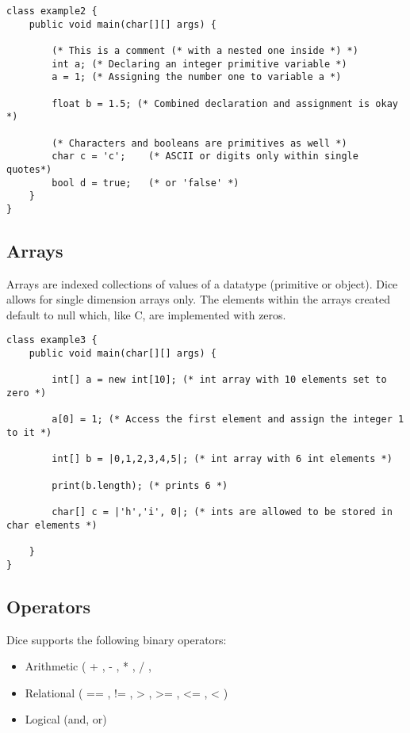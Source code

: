 \begin{homeworkProblem}
	\begin{verbatim}
class example2 {
	public void main(char[][] args) {

		(* This is a comment (* with a nested one inside *) *)
		int a; (* Declaring an integer primitive variable *)
		a = 1; (* Assigning the number one to variable a *)

		float b = 1.5; (* Combined declaration and assignment is okay *)

		(* Characters and booleans are primitives as well *)
		char c = 'c';    (* ASCII or digits only within single quotes*)
		bool d = true;   (* or 'false' *)
	}
}
	\end{verbatim}

	\subsection{Arrays}
	Arrays are indexed collections of values of a datatype (primitive or object). Dice allows for single dimension arrays only. The elements within the arrays created default to null which, like C, are implemented with zeros.

	\begin{verbatim}
class example3 {
	public void main(char[][] args) {

		int[] a = new int[10]; (* int array with 10 elements set to zero *)

		a[0] = 1; (* Access the first element and assign the integer 1 to it *)
		
		int[] b = |0,1,2,3,4,5|; (* int array with 6 int elements *)

		print(b.length); (* prints 6 *)

		char[] c = |'h','i', 0|; (* ints are allowed to be stored in char elements *) 

	}
}
	\end{verbatim}

	\subsection{Operators}
	Dice supports the following binary operators:
	\begin{itemize}
		\item Arithmetic ( + , - , * , / , %
		\item Relational ( == , != , > , >= , <= , < )
		\item Logical (and, or)
	\end{itemize}


\end{homeworkProblem}

